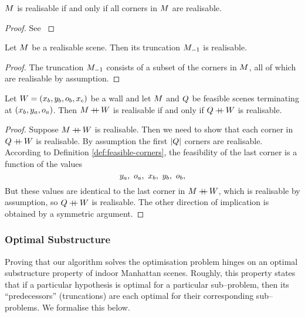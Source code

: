 \begin{lemma}
  \label{def:feasible-scenes}
  $\Scene$ is realisable if and only if all corners in
  $\Scene$ are realisable.
\end{lemma}
\begin{proof}
  See \cite{Lee09}
\end{proof}

\begin{lemma}
  \label{lemma:trunc-feasibility}
  Let $\Scene$ be a realisable scene. Then its truncation $\Scene_{-1}$ is
  realisable.
\end{lemma}
\begin{proof}
  The truncation $\Scene_{-1}$ consists of a subset of the corners in
  $\Scene$, all of which are realisable by assumption.
\end{proof}

\begin{lemma}
  \label{lemma:concat-feasibility}
  Let $\Wall=(x_b,y_b,\WallOrient_b,x_c)$ be a wall and let $\Scene$ and
  $\OtherScene$ be feasible scenes terminating at
  $(x_b,y_a,\WallOrient_a)$. Then $\Scene\concat\Wall$ is realisable if
  and only if $\OtherScene\concat\Wall$ is realisable.
\end{lemma}
\begin{proof}
  Suppose $\Scene\concat\Wall$ is realisable. Then we need to show that
  each corner in $\OtherScene\concat\Wall$ is realisable. By assumption
  the first $\Length{\OtherScene}$ corners are realisable. According to
  Definition \ref{def:feasible-corners}, the feasibility of the last corner
  is a function of the values
  \begin{equation}
    y_a,~\WallOrient_a,~x_b,~y_b,~\WallOrient_b,
  \end{equation}
  But these values are identical to the last corner in
  $\Scene\concat\Wall$, which is realisable by assumption, so
  $\OtherScene\concat\Wall$ is realisable. The other
  direction of implication is obtained by a symmetric argument.
\end{proof}

\subsubsection{Optimal Substructure}

Proving that our algorithm solves the optimisation problem
 hinges on an optimal substructure property of
indoor Manhattan scenes. Roughly, this property states that if a
particular hypothesis is optimal for a particular sub--problem, then its
``predecessors'' (truncations) are each optimal for their
corresponding sub--problems. We formalise this below.

